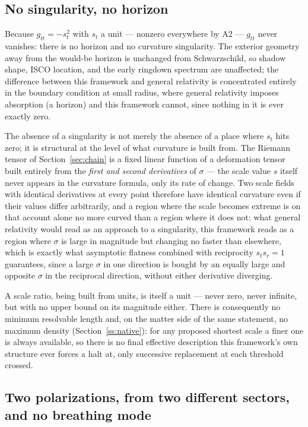 \documentclass[pdflatex,sn-mathphys-num]{sn-jnl}
\theoremstyle{thmstyleone}
\theoremstyle{thmstylethree}
\theoremstyle{thmstyletwo}
\begin{document}
\subsection{No singularity, no horizon}

Because $g_{tt}=-s_t^2$ with $s_t$ a unit — nonzero everywhere by A2 —
$g_{tt}$ never vanishes: there is no horizon and no curvature
singularity. The exterior geometry away from the would-be horizon is
unchanged from Schwarzschild, so shadow shape, ISCO location, and the
early ringdown spectrum are unaffected; the difference between this
framework and general relativity is concentrated entirely in the
boundary condition at small radius, where general relativity imposes
absorption (a horizon) and this framework cannot, since nothing in it is
ever exactly zero.

The absence of a singularity is not merely the absence of a place where
$s_t$ hits zero; it is structural at the level of what curvature is
built from. The Riemann tensor of Section~\ref{sec:chain} is a fixed
linear function of a deformation tensor built entirely from the
\emph{first and second derivatives} of $\sigma$ — the scale value $s$
itself never appears in the curvature formula, only its rate of change.
Two scale fields with identical derivatives at every point therefore
have identical curvature even if their values differ arbitrarily, and a
region where the scale becomes extreme is on that account alone no more
curved than a region where it does not: what general relativity would
read as an approach to a singularity, this framework reads as a region
where $\sigma$ is large in magnitude but changing no faster than
elsewhere, which is exactly what asymptotic flatness combined with
reciprocity $s_ts_r=1$ guarantees, since a large $\sigma$ in one
direction is bought by an equally large and opposite $\sigma$ in the
reciprocal direction, without either derivative diverging.

A scale ratio, being built from units, is itself a unit — never zero,
never infinite, but with no upper bound on its magnitude either. There
is consequently no minimum resolvable length and, on the matter side of
the same statement, no maximum density
(Section~\ref{ss:native}): for any proposed shortest scale a finer one
is always available, so there is no final effective description this
framework's own structure ever forces a halt at, only successive
replacement at each threshold crossed.

\subsection{Two polarizations, from two different sectors, and no breathing mode}\label{ss:pol}
\end{document}
